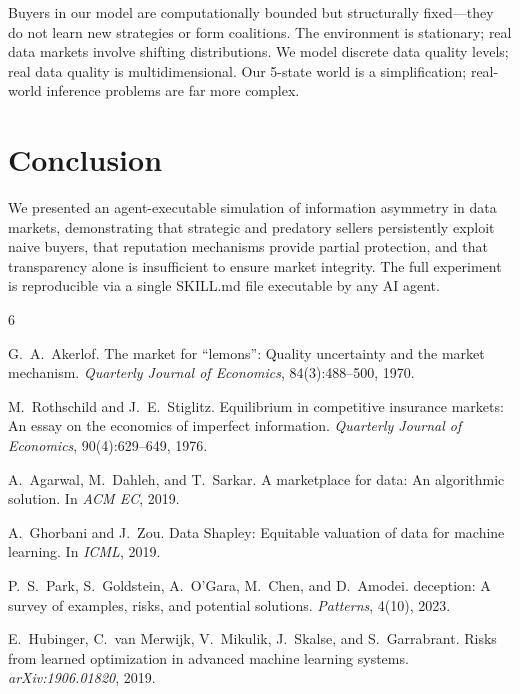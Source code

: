 \documentclass[11pt]{article}
\begin{document}
Buyers in our model are computationally bounded but structurally fixed---they do not learn new strategies or form coalitions.
The environment is stationary; real data markets involve shifting distributions.
We model discrete data quality levels; real data quality is multidimensional.
Our 5-state world is a simplification; real-world inference problems are far more complex.

\section{Conclusion}

We presented an agent-executable simulation of information asymmetry in data markets, demonstrating that strategic and predatory sellers persistently exploit naive buyers, that reputation mechanisms provide partial protection, and that transparency alone is insufficient to ensure market integrity.
The full experiment is reproducible via a single SKILL.md file executable by any AI agent.


\begin{thebibliography}{6}

G.~A.~Akerlof.
\newblock The market for ``lemons'': Quality uncertainty and the market mechanism.
\newblock \emph{Quarterly Journal of Economics}, 84(3):488--500, 1970.

M.~Rothschild and J.~E.~Stiglitz.
\newblock Equilibrium in competitive insurance markets: An essay on the economics of imperfect information.
\newblock \emph{Quarterly Journal of Economics}, 90(4):629--649, 1976.

A.~Agarwal, M.~Dahleh, and T.~Sarkar.
\newblock A marketplace for data: An algorithmic solution.
\newblock In \emph{ACM EC}, 2019.

A.~Ghorbani and J.~Zou.
\newblock Data {Shapley}: Equitable valuation of data for machine learning.
\newblock In \emph{ICML}, 2019.

P.~S.~Park, S.~Goldstein, A.~O'Gara, M.~Chen, and D.~Amodei.
 deception: A survey of examples, risks, and potential solutions.
\newblock \emph{Patterns}, 4(10), 2023.

E.~Hubinger, C.~van Merwijk, V.~Mikulik, J.~Skalse, and S.~Garrabrant.
\newblock Risks from learned optimization in advanced machine learning systems.
\newblock \emph{arXiv:1906.01820}, 2019.

\end{thebibliography}
\end{document}
